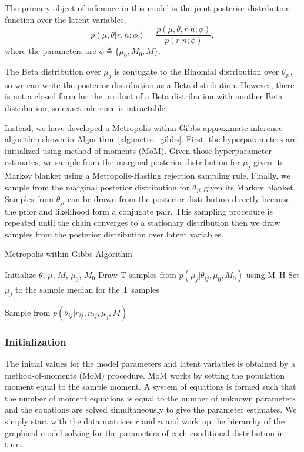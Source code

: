 \documentclass[11pt,reqno]{amsart}
\begin{document}
The primary object of inference in this model is the joint posterior distribution function over the latent variables,
\begin{equation}
	p(\mu, \theta | r, n; \phi)  = \frac{ p(\mu, \theta, r | n; \phi) } {p ( r | n; \phi)},
\end{equation}
where the parameters are $\phi \triangleq \{\mu_0, M_0, M\}$.

The Beta distribution over $\mu_j$ is conjugate to the Binomial distribution over $\theta_{ji}$, so we can write the posterior distribution as a Beta distribution. However, there is not a closed form for the product of a Beta distribution with another Beta distribution, so exact inference is intractable.

Instead, we have developed a Metropolis-within-Gibbs  approximate inference algorithm shown in Algorithm~\ref{alg:metro_gibbs}. First, the hyperparameters are initialized using method-of-moments (MoM). Given those hyperparameter estimates, we sample from the marginal posterior distribution for $\mu_j$ given its Markov blanket using a Metropolis-Hasting rejection sampling rule. Finally, we sample from the marginal posterior distribution for $\theta_{ji}$ given its Markov blanket. Samples from $\theta_{ji}$ can be drawn from the posterior distribution directly  because the prior and likelihood form a conjugate pair. This sampling procedure is repeated until the chain converges to a stationary distribution then we draw samples from the posterior distribution over latent variables.

\begin{algorithm}[ht]
\caption{Metropolis-within-Gibbs Algorithm}
\label{alg:metro_gibbs}
\begin{algorithmic}[1]

\State Initialize $\theta$, $\mu$, $M$, $\mu_0$, $M_0$
\Repeat
{} 
  \State Draw T samples from $p \left( \mu_j |\theta_{ij},\mu_0,M_0\right)$ using M--H
  \State Set $\mu_j$ to the sample median for the T samples


   
	\State Sample from $p \left( \theta_{ij} |r_{ij},n_{ij},\mu_j,M \right)$
  \EndFor

\EndFor
{}
\end{algorithmic}
\end{algorithm}

\subsubsection{Initialization}
The initial values for the model parameters and latent variables is obtained by a method-of-moments (MoM) procedure. MoM works by setting the population moment equal to the sample moment. A system of equations is formed such that the number of moment equations is equal to the number of unknown parameters and the equations are solved simultaneously to give the parameter estimates. We simply start with the data matrices $r$ and $n$ and work up the hierarchy of the graphical model solving for the parameters of each conditional distribution in turn.
\end{document}
